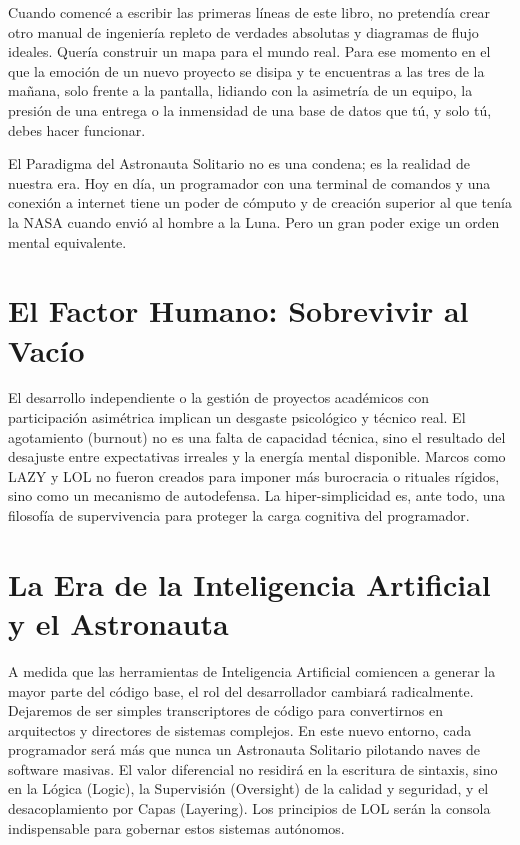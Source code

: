 \documentclass[14pt,a4paper,oneside]{extbook}
\begin{document}
Cuando comencé a escribir las primeras líneas de este libro, no pretendía crear otro manual de ingeniería repleto de verdades absolutas y diagramas de flujo ideales. Quería construir un mapa para el mundo real. Para ese momento en el que la emoción de un nuevo proyecto se disipa y te encuentras a las tres de la mañana, solo frente a la pantalla, lidiando con la asimetría de un equipo, la presión de una entrega o la inmensidad de una base de datos que tú, y solo tú, debes hacer funcionar.

El Paradigma del Astronauta Solitario no es una condena; es la realidad de nuestra era. Hoy en día, un programador con una terminal de comandos y una conexión a internet tiene un poder de cómputo y de creación superior al que tenía la NASA cuando envió al hombre a la Luna. Pero un gran poder exige un orden mental equivalente.

\section{El Factor Humano: Sobrevivir al Vacío}

El desarrollo independiente o la gestión de proyectos académicos con participación asimétrica implican un desgaste psicológico y técnico real. El agotamiento (burnout) no es una falta de capacidad técnica, sino el resultado del desajuste entre expectativas irreales y la energía mental disponible. Marcos como LAZY y LOL no fueron creados para imponer más burocracia o rituales rígidos, sino como un mecanismo de autodefensa. La hiper-simplicidad es, ante todo, una filosofía de supervivencia para proteger la carga cognitiva del programador.

\section{La Era de la Inteligencia Artificial y el Astronauta}

A medida que las herramientas de Inteligencia Artificial comiencen a generar la mayor parte del código base, el rol del desarrollador cambiará radicalmente. Dejaremos de ser simples transcriptores de código para convertirnos en arquitectos y directores de sistemas complejos. En este nuevo entorno, cada programador será más que nunca un Astronauta Solitario pilotando naves de software masivas. El valor diferencial no residirá en la escritura de sintaxis, sino en la Lógica (Logic), la Supervisión (Oversight) de la calidad y seguridad, y el desacoplamiento por Capas (Layering). Los principios de LOL serán la consola indispensable para gobernar estos sistemas autónomos.
\end{document}
